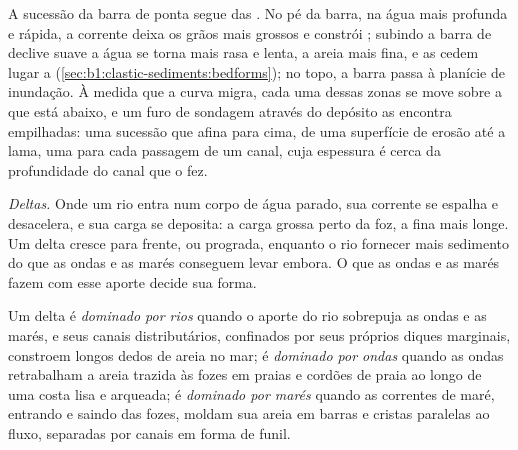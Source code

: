 A sucessão da barra de ponta segue das . No pé da barra, na água mais profunda e rápida, a corrente deixa os grãos mais grossos e constrói ; subindo a barra de declive suave a água se torna mais rasa e lenta, a areia mais fina, e as  cedem lugar a  (\cref{sec:b1:clastic-sediments:bedforms}); no topo, a barra passa à planície de inundação. À medida que a curva migra, cada uma dessas zonas se move sobre a que está abaixo, e um furo de sondagem através do depósito as encontra empilhadas: uma sucessão que afina para cima, de uma superfície de erosão até a lama, uma para cada passagem de um canal,
cuja espessura é cerca da profundidade do canal que o fez.

\emph{Deltas.} Onde um rio entra num corpo de água parado, sua corrente se espalha e desacelera, e sua carga se deposita: a carga grossa perto da foz, a fina mais longe. Um delta cresce para frente, ou prograda, enquanto o rio fornecer mais sedimento do que as ondas e as marés conseguem levar embora. O que as ondas e as marés fazem com esse aporte decide sua forma.

\begin{definition}\label{def:b1:clastic-sediments:delta}
Um delta é \emph{dominado por rios} quando o aporte do rio sobrepuja as ondas e as marés, e seus canais distributários, confinados por seus próprios diques marginais, constroem longos dedos de areia no mar; é \emph{dominado por ondas} quando as ondas retrabalham a areia trazida às fozes em praias e cordões de praia ao longo de uma costa lisa e arqueada; é \emph{dominado por marés} quando as correntes de maré, entrando e saindo das fozes, moldam sua areia em barras e cristas paralelas ao fluxo, separadas por canais em forma de funil.
\end{definition}

